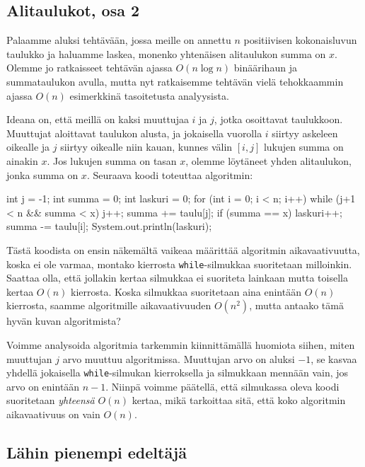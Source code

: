 \subsection{Alitaulukot, osa 2}

Palaamme aluksi tehtävään, jossa meille on annettu
$n$ positiivisen kokonaisluvun taulukko ja haluamme laskea,
monenko yhtenäisen alitaulukon summa on $x$.
Olemme jo ratkaisseet tehtävän ajassa $O(n \log n)$
binäärihaun ja summataulukon avulla,
mutta nyt ratkaisemme tehtävän vielä tehokkaammin
ajassa $O(n)$ esimerkkinä tasoitetusta analyysista.

Ideana on, että meillä on kaksi muuttujaa $i$ ja $j$,
jotka osoittavat taulukkoon.
Muuttujat aloittavat taulukon alusta,
ja jokaisella vuorolla $i$ siirtyy askeleen oikealle
ja $j$ siirtyy oikealle niin kauan, kunnes välin $[i,j]$
lukujen summa on ainakin $x$.
Jos lukujen summa on tasan $x$, olemme löytäneet yhden
alitaulukon, jonka summa on $x$.
Seuraava koodi toteuttaa algoritmin:

\begin{code}
int j = -1;
int summa = 0;
int laskuri = 0;
for (int i = 0; i < n; i++) {
    while (j+1 < n && summa < x) {
        j++;
        summa += taulu[j];
    }
    if (summa == x) laskuri++;
    summa -= taulu[i];
}
System.out.println(laskuri);
\end{code}

Tästä koodista on ensin näkemältä vaikeaa määrittää algoritmin
aikavaativuutta, koska ei ole varmaa, montako kierrosta
\texttt{while}-silmukkaa suoritetaan milloinkin.
Saattaa olla, että jollakin kertaa silmukkaa ei suoriteta lainkaan
mutta toisella kertaa $O(n)$ kierrosta.
Koska silmukkaa suoritetaan aina enintään $O(n)$ kierrosta,
saamme algoritmille aikavaativuuden $O(n^2)$,
mutta antaako tämä hyvän kuvan algoritmista?

Voimme analysoida algoritmia tarkemmin kiinnittämällä huomiota
siihen, miten muuttujan $j$ arvo muuttuu algoritmissa.
Muuttujan arvo on aluksi $-1$,
se kasvaa yhdellä jokaisella \texttt{while}-silmukan kierroksella
ja silmukkaan mennään vain, jos arvo on enintään $n-1$.
Niinpä voimme päätellä, että silmukassa oleva koodi suoritetaan \emph{yhteensä}
$O(n)$ kertaa, mikä tarkoittaa sitä,
että koko algoritmin aikavaativuus on vain $O(n)$.

\subsection{Lähin pienempi edeltäjä}

